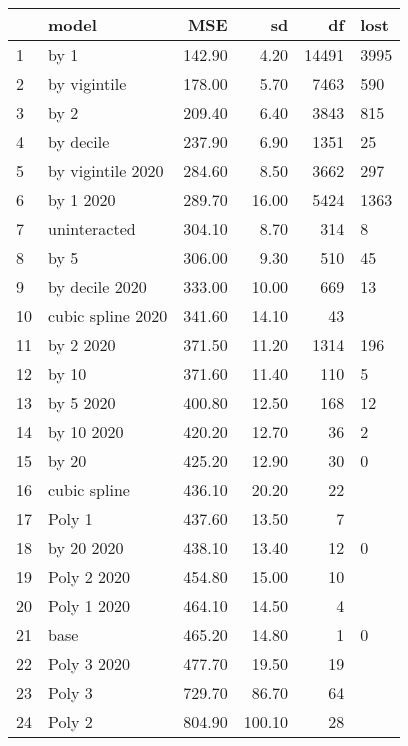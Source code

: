 \begin{table}[ht]
\centering
\begin{tabular}{llrrrl}
  \hline
 & model & MSE & sd & df & lost \\ 
  \hline
1 & by 1 & 142.90 & 4.20 & 14491 & 3995 \\ 
  2 & by vigintile & 178.00 & 5.70 & 7463 &  590 \\ 
  3 & by 2 & 209.40 & 6.40 & 3843 &  815 \\ 
  4 & by decile & 237.90 & 6.90 & 1351 &   25 \\ 
  5 & by vigintile 2020 & 284.60 & 8.50 & 3662 &  297 \\ 
  6 & by 1 2020 & 289.70 & 16.00 & 5424 & 1363 \\ 
  7 & uninteracted & 304.10 & 8.70 & 314 &    8 \\ 
  8 & by 5 & 306.00 & 9.30 & 510 &   45 \\ 
  9 & by decile 2020 & 333.00 & 10.00 & 669 &   13 \\ 
  10 & cubic spline 2020 & 341.60 & 14.10 &  43 &  \\ 
  11 & by 2 2020 & 371.50 & 11.20 & 1314 &  196 \\ 
  12 & by 10 & 371.60 & 11.40 & 110 &    5 \\ 
  13 & by 5 2020 & 400.80 & 12.50 & 168 &   12 \\ 
  14 & by 10 2020 & 420.20 & 12.70 &  36 &    2 \\ 
  15 & by 20 & 425.20 & 12.90 &  30 &    0 \\ 
  16 & cubic spline & 436.10 & 20.20 &  22 &  \\ 
  17 & Poly 1 & 437.60 & 13.50 &   7 &  \\ 
  18 & by 20 2020 & 438.10 & 13.40 &  12 &    0 \\ 
  19 & Poly 2 2020 & 454.80 & 15.00 &  10 &  \\ 
  20 & Poly 1 2020 & 464.10 & 14.50 &   4 &  \\ 
  21 & base & 465.20 & 14.80 &   1 &    0 \\ 
  22 & Poly 3 2020 & 477.70 & 19.50 &  19 &  \\ 
  23 & Poly 3 & 729.70 & 86.70 &  64 &  \\ 
  24 & Poly 2 & 804.90 & 100.10 &  28 &  \\ 
   \hline
\end{tabular}
\end{table}
